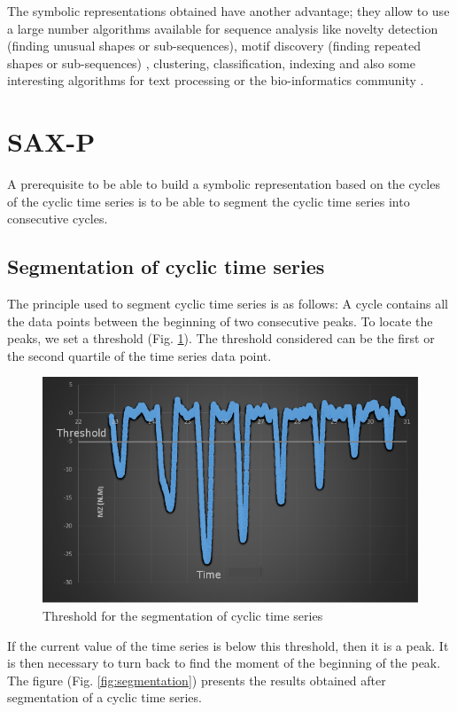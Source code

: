  The symbolic representations obtained have another advantage;
they allow to use a large number algorithms available
for sequence analysis like novelty detection (finding
unusual shapes or sub-sequences), motif discovery (finding
repeated shapes or sub-sequences) \cite{Begum2014}, clustering, classification,
indexing and also some interesting algorithms for
text processing or the bio-informatics community \cite{Aach2001, Papapetrou2011, Dietterich2002}. 

\section{SAX-P}

A prerequisite to be able to build a symbolic representation based on the cycles of the cyclic time series is to be able to segment the cyclic time series into consecutive cycles.

\subsection{Segmentation of cyclic time series}
The principle used to segment cyclic time series is as follows: A cycle contains all the data points between the beginning of two consecutive peaks. To locate the peaks, we set a threshold (Fig. \ref{fig:seuil}). The threshold considered can be the first or the second quartile of the time series data point.

	 \begin{figure}[h]
  \centering
   \includegraphics[scale=0.4]{images/sax-p/sax-p_deplacement_seuil}
    \caption{Threshold for the segmentation of cyclic time series}
  \label{fig:seuil}
  \end{figure}

If the current value of the time series is below this threshold, then it is a peak. It is then necessary to turn back to find the moment of the beginning of the peak. The figure (Fig. \ref{fig:segmentation}) presents the results obtained after segmentation of a cyclic time series.

